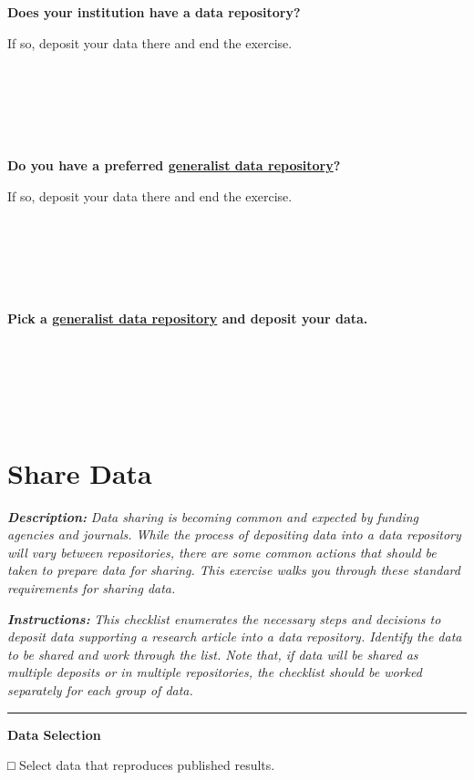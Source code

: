 \documentclass[
]{book}
\begin{document}
~

~

\textbf{Does your institution have a data repository?}

If so, deposit your data there and end the exercise.

~

~

~

\textbf{Do you have a preferred \href{https://sharing.nih.gov/data-management-and-sharing-policy/sharing-scientific-data/generalist-repositories}{generalist data repository}?}

If so, deposit your data there and end the exercise.

~

~

~

\textbf{Pick a \href{https://sharing.nih.gov/data-management-and-sharing-policy/sharing-scientific-data/generalist-repositories}{generalist data repository} and deposit your data.}

~

~

~

\hypertarget{share-data}{%
\section{Share Data}\label{share-data}}

\textbf{\emph{Description:}} \emph{Data sharing is becoming common and expected by funding agencies and journals. While the process of depositing data into a data repository will vary between repositories, there are some common actions that should be taken to prepare data for sharing. This exercise walks you through these standard requirements for sharing data.}

\textbf{\emph{Instructions:}} \emph{This checklist enumerates the necessary steps and decisions to deposit data supporting a research article into a data repository. Identify the data to be shared and work through the list. Note that, if data will be shared as multiple deposits or in multiple repositories, the checklist should be worked separately for each group of data.}

\begin{center}\rule{0.5\linewidth}{0.5pt}\end{center}

\textbf{Data Selection}

□ Select data that reproduces published results.
\end{document}

